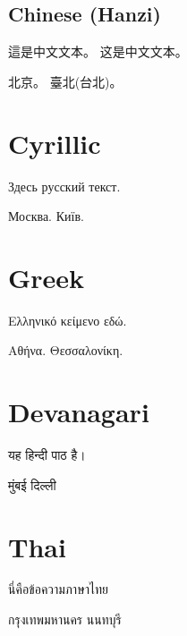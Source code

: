 \documentclass[a4paper]{article}
\begin{document}
\subsection{Chinese (Hanzi)}
\begin{chinese}
這是中文文本。
这是中文文本。

北京。
臺北(台北)。
\end{chinese}

\section{Cyrillic}
\begin{russian}
Здесь русский текст.

Москва.
Київ.
\end{russian}

\section{Greek}
\begin{greek}
Ελληνικό κείμενο εδώ.

Αθήνα.
Θεσσαλονίκη.
\end{greek}

\section{Devanagari}
\begin{hindi}
यह हिन्दी पाठ है।

मुंबई
दिल्ली
\end{hindi}

\section{Thai}
\begin{thai}
นี่คือข้อความภาษาไทย

กรุงเทพมหานคร
นนทบุรี
\end{thai}
\end{document}
